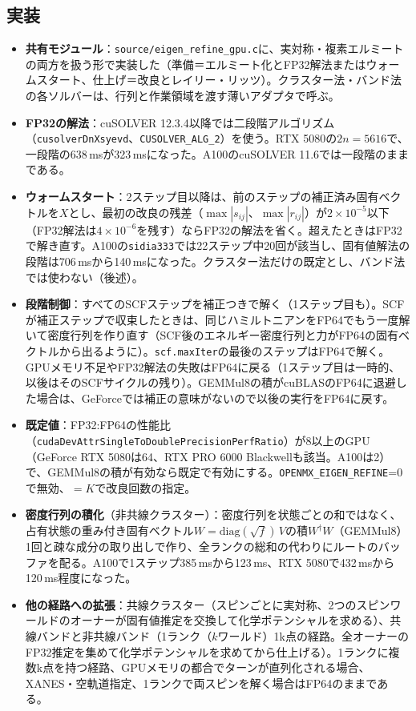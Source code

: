 \documentclass[a4paper,11pt]{ltjsarticle}
\newcommand{\code}[1]{\texttt{#1}}
\newcommand{\E}[1]{\times10^{#1}}
\begin{document}
\subsection{実装}
\begin{itemize}
\item \textbf{共有モジュール}：\code{source/eigen\_refine\_gpu.c}に、実対称・複素エルミートの両方を扱う形で実装した（準備＝エルミート化とFP32解法またはウォームスタート、仕上げ＝改良とレイリー・リッツ）。クラスター法・バンド法の各ソルバーは、行列と作業領域を渡す薄いアダプタで呼ぶ。
\item \textbf{FP32の解法}：cuSOLVER 12.3.4以降では二段階アルゴリズム（\code{cusolverDnXsyevd}、\code{CUSOLVER\_ALG\_2}）を使う。RTX 5080の$2n=5616$で、一段階の638\,msが323\,msになった。A100のcuSOLVER 11.6では一段階のままである。
\item \textbf{ウォームスタート}：2ステップ目以降は、前のステップの補正済み固有ベクトルを$X$とし、最初の改良の残差（$\max|s_{ij}|$、$\max|r_{ij}|$）が$2\E{-5}$以下（FP32解法は$4\E{-6}$を残す）ならFP32の解法を省く。超えたときはFP32で解き直す。A100の\code{sidia333}では22ステップ中20回が該当し、固有値解法の段階は706\,msから140\,msになった。クラスター法だけの既定とし、バンド法では使わない（後述）。
\item \textbf{段階制御}：すべてのSCFステップを補正つきで解く（1ステップ目も）。SCFが補正ステップで収束したときは、同じハミルトニアンをFP64でもう一度解いて密度行列を作り直す（SCF後のエネルギー密度行列と力がFP64の固有ベクトルから出るように）。\code{scf.maxIter}の最後のステップはFP64で解く。GPUメモリ不足やFP32解法の失敗はFP64に戻る（1ステップ目は一時的、以後はそのSCFサイクルの残り）。GEMMul8の積がcuBLASのFP64に退避した場合は、GeForceでは補正の意味がないので以後の実行をFP64に戻す。
\item \textbf{既定値}：FP32:FP64の性能比（\code{cudaDevAttrSingleToDoublePrecisionPerfRatio}）が8以上のGPU（GeForce RTX 5080は64、RTX PRO 6000 Blackwellも該当。A100は2）で、GEMMul8の積が有効なら既定で有効にする。\code{OPENMX\_EIGEN\_REFINE}=0で無効、$=K$で改良回数の指定。
\item \textbf{密度行列の積化}（非共線クラスター）：密度行列を状態ごとの和ではなく、占有状態の重み付き固有ベクトル$W=\mathrm{diag}(\sqrt f)\,V$の積$W^{\dagger}W$（GEMMul8）1回と疎な成分の取り出しで作り、全ランクの総和の代わりにルートのバッファを配る。A100で1ステップ385\,msから123\,ms、RTX 5080で432\,msから120\,ms程度になった。
\item \textbf{他の経路への拡張}：共線クラスター（スピンごとに実対称、2つのスピンワールドのオーナーが固有値推定を交換して化学ポテンシャルを求める）、共線バンドと非共線バンド（1ランク（$k$ワールド）1k点の経路。全オーナーのFP32推定を集めて化学ポテンシャルを求めてから仕上げる）。1ランクに複数k点を持つ経路、GPUメモリの都合でターンが直列化される場合、XANES・空軌道指定、1ランクで両スピンを解く場合はFP64のままである。
\end{itemize}
\end{document}
